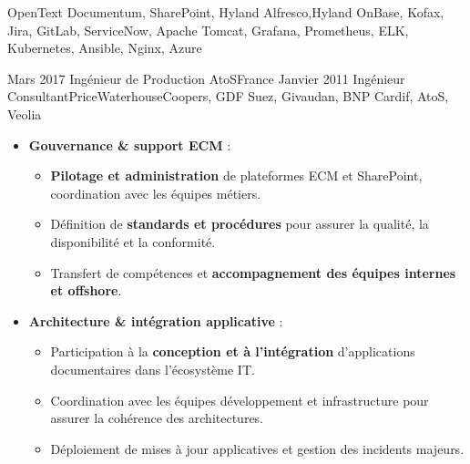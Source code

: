\begin{experiences}
{\begin{itemize}[left=0pt,label={},itemsep=0.5em]
        \end{itemize}
        \vspace{0.3em}
    }
    {OpenText Documentum, SharePoint, Hyland Alfresco,Hyland OnBase, Kofax, Jira, GitLab, ServiceNow, Apache Tomcat, Grafana, Prometheus, ELK, Kubernetes, Ansible, Nginx, Azure}

\emptySeparator
\emptySeparator

\consultantexperience
    {Mars 2017}       {Ingénieur de Production }{AtoS}{France}
    {Janvier 2011}    {Ingénieur Consultant}{PriceWaterhouseCoopers, GDF Suez, Givaudan, BNP Cardif, AtoS, Veolia} {
        \begin{itemize}[left=0pt,label={},itemsep=0.4em]
        \vspace{0.3em}  %
          \item \textbf{Gouvernance \& support ECM} :
            \begin{itemize}[itemsep=0.15em,topsep=0.1em,parsep=0pt]
              \small
              \item \textbf{Pilotage et administration} de plateformes ECM et SharePoint, coordination avec les équipes métiers.
              \item Définition de \textbf{standards et procédures} pour assurer la qualité, la disponibilité et la conformité.
              \item Transfert de compétences et \textbf{accompagnement des équipes internes et offshore}.
            \end{itemize}
        \vspace{0.3em}  %
          \item \textbf{Architecture \& intégration applicative} :
            \begin{itemize}[itemsep=0.15em,topsep=0.1em,parsep=0pt]
              \small
              \item Participation à la \textbf{conception et à l’intégration} d’applications documentaires dans l’écosystème IT.
              \item Coordination avec les équipes développement et infrastructure pour assurer la cohérence des architectures.
              \item Déploiement de mises à jour applicatives et gestion des incidents majeurs.
            \end{itemize}
        \vspace{0.3em}  %

\end{itemize}}
\end{experiences}

